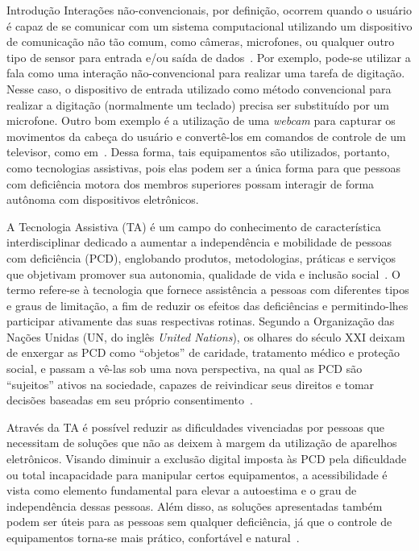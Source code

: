 \begin{chapter}{Introdução}
Interações não-convencionais, por definição, ocorrem quando o usuário é capaz de
se comunicar com um sistema computacional utilizando um dispositivo de
comunicação não tão comum, como câmeras, microfones, ou qualquer outro tipo de
sensor para entrada e/ou saída de dados~\cite{Machado10}. Por exemplo, pode-se
utilizar a fala como uma interação não-convencional para realizar uma tarefa de
digitação. Nesse caso, o dispositivo de entrada utilizado como método
convencional para realizar a digitação (normalmente um teclado) precisa ser
substituído por um microfone. Outro bom exemplo é a utilização de uma
\textit{webcam} para capturar os movimentos da cabeça do usuário e convertê-los
em comandos de controle de um televisor, como em~\cite{Batista17}. Dessa forma,
tais equipamentos são utilizados, portanto, como tecnologias assistivas, pois
elas podem ser a única forma para que pessoas com deficiência motora dos
membros superiores possam interagir de forma autônoma com dispositivos
eletrônicos. %
 
A Tecnologia Assistiva (TA) é um campo do conhecimento de característica
interdisciplinar dedicado a aumentar a independência e mobilidade de pessoas
com deficiência (PCD), englobando produtos, metodologias, práticas e serviços
que objetivam promover sua autonomia, qualidade de vida e inclusão
social~\cite{cat09}. O termo refere-se à tecnologia que fornece
assistência a pessoas com diferentes tipos e graus de limitação, a fim de
reduzir os efeitos das deficiências e permitindo-lhes participar ativamente das
suas respectivas rotinas. Segundo a Organização das Nações Unidas (UN, do inglês
\textit{United Nations}), os olhares do século XXI deixam de enxergar as PCD
como ``objetos'' de caridade, tratamento médico e proteção social, e passam a
vê-las sob uma nova perspectiva, na qual as PCD são ``sujeitos'' ativos na
sociedade, capazes de reivindicar seus direitos e tomar decisões baseadas em seu
próprio consentimento~\cite{UN07}. %

Através da TA é possível reduzir as dificuldades vivenciadas por pessoas que
necessitam de soluções que não as deixem à margem da utilização de aparelhos
eletrônicos. Visando diminuir a exclusão digital imposta às PCD pela
dificuldade ou total incapacidade para manipular certos equipamentos, a
acessibilidade é vista como elemento fundamental para elevar a autoestima e o
grau de independência dessas pessoas. Além disso, as soluções apresentadas
também podem ser úteis para as pessoas sem qualquer deficiência, já que o
controle de equipamentos torna-se mais prático, confortável e
natural~\cite{Wechsung09}. %


\end{chapter}
